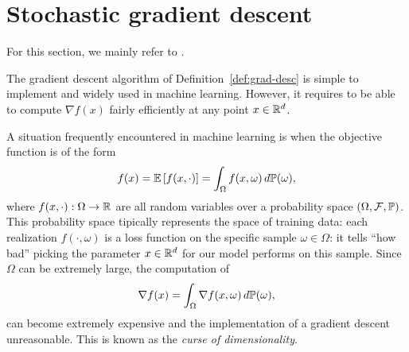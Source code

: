 \documentclass{report}
\begin{document}
\section{Stochastic gradient descent}

For this section, we mainly refer to \cite{royerLecture}.

The gradient descent algorithm of Definition~\ref{def:grad-desc} is simple to implement and widely used in machine learning. However, it requires to be able to compute $\nabla f(x)$ fairly efficiently at any point $x\in\mathbb{R}^d$.

A situation frequently encountered in machine learning is when the objective function is of the form 
\begin{equation}
	\label{eq:loss}
	f(x) = \mathbb{E} \left[f(x,\cdot)\right] = \int_\Omega f(x,\omega)\, d\mathbb{P}(\omega),
\end{equation}
where $f(x,\cdot):\Omega\to \mathbb{R}$ are all random variables over a probability space $(\Omega,\mathcal{F}, \mathbb{P})$.
This probability space tipically represents the space of training data: each realization $f(\cdot,\omega)$ is a loss function on the specific sample $\omega\in \Omega$: it tells ``how bad'' picking the parameter $x\in\mathbb{R}^d$ for our model performs on this sample. 
Since $\Omega$ can be extremely large,  the computation of
\begin{equation}
	\label{eq:full-grad}
	\nabla f(x) = \int_{\Omega} \nabla f(x,\omega) \, d\mathbb{P}(\omega),
\end{equation}
can become extremely expensive and the implementation of a gradient descent unreasonable.
This is known as the \emph{curse of dimensionality}.

\end{document}
